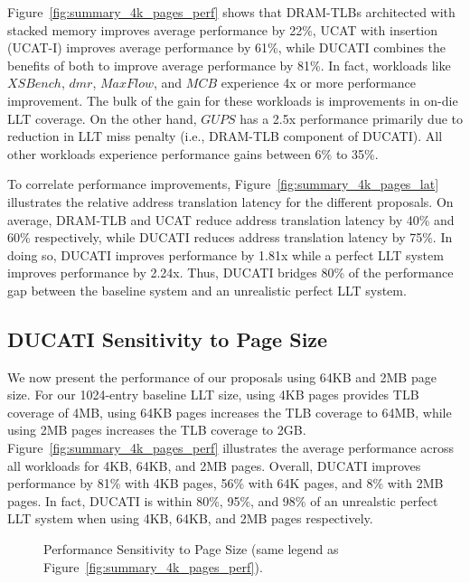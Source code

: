 Figure~\ref{fig:summary_4k_pages_perf} shows that DRAM-TLBs
architected with stacked memory improves average performance by 22\%,
UCAT with insertion (UCAT-I) improves average performance by 61\%,
while DUCATI combines the benefits of both to improve average
performance by 81\%. In fact, workloads like $XSBench$, $dmr$,
$MaxFlow$, and $MCB$ experience 4x or more performance improvement.
The bulk of the gain for these workloads is improvements in on-die LLT
coverage. On the other hand, $GUPS$ has a 2.5x performance primarily
due to reduction in LLT miss penalty (i.e., DRAM-TLB component of
DUCATI). All other workloads experience performance gains between 6\%
to 35\%.

To correlate performance improvements,
Figure~\ref{fig:summary_4k_pages_lat} illustrates the relative address
translation latency for the different proposals. On average, DRAM-TLB
and UCAT reduce address translation latency by 40\% and 60\%
respectively, while DUCATI reduces address translation latency by
75\%. In doing so, DUCATI improves performance by 1.81x while a
perfect LLT system improves performance by 2.24x. Thus, DUCATI bridges
80\% of the performance gap between the baseline system and an
unrealistic perfect LLT system.



\subsection{DUCATI Sensitivity to Page Size}

\noindent We now present the performance of our proposals using 64KB
and 2MB page size. For our 1024-entry baseline LLT size, using 4KB
pages provides TLB coverage of 4MB, using 64KB pages increases the TLB
coverage to 64MB, while using 2MB pages increases the TLB coverage to
2GB. Figure~\ref{fig:summary_4k_pages_perf} illustrates the average
performance across all workloads for 4KB, 64KB, and 2MB pages.
Overall, DUCATI improves performance by 81\% with 4KB pages, 56\% with
64K pages, and 8\% with 2MB pages. In fact, DUCATI is within 80\%,
95\%, and 98\% of an unrealstic perfect LLT system when using 4KB,
64KB, and 2MB pages respectively.

\begin{figure}[tp] 
\vspace{0. in} \centering
\centerline{}

\caption{\small Performance Sensitivity to Page Size (same legend as
Figure~\ref{fig:summary_4k_pages_perf}). \normalsize}

\label{fig:summary_pagesize} 
\vspace{-0. in}
\end{figure}

